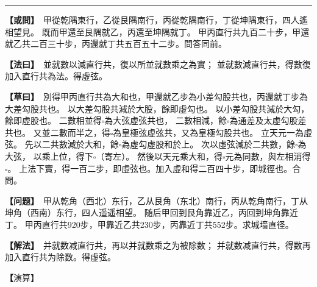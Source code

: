 \documentclass[11pt,a4paper]{article}
\let\origsquare\square
\renewcommand{\square}{\ensuremath{\origsquare}}%
\newcommand{\longline}{\noindent\rule{\textwidth}{0.4pt}}
\newcommand{\clOWEN}[1]{%
  \par\vspace{0.3em}%
  \noindent\textcolor{problemcolor}{\textbf{【或問】}}\,{\tradfont #1}\par\nopagebreak%
}
\newcommand{\mdOWEN}[1]{%
  \par\vspace{0.3em}%
  \noindent\textcolor{problemcolor}{\textbf{【问题】}}\,{\modfont #1}\par\nopagebreak%
}
\newcommand{\clFAYUE}[1]{%
  \par\noindent\textcolor{methodcolor}{\textbf{【法曰】}}\,{\tradfont #1}\par\nopagebreak%
}
\newcommand{\mdFAYUE}[1]{%
  \par\noindent\textcolor{methodcolor}{\textbf{【解法】}}\,{\modfont #1}\par\nopagebreak%
}
\newcommand{\clTSAOYUE}[1]{%
  \par\noindent\textcolor{workcolor}{\textbf{【草曰】}}\,{\tradfont #1}\par%
}
\newcommand{\mdTSAOYUE}[1]{%
  \par\noindent\textcolor{workcolor}{\textbf【演算】}}\,{\modfont #1}\par%
\begin{document}
\vspace{0.3cm}
\begin{center}\longline\end{center}

\begin{paracol}{2}

\begin{leftcolumn}
\clOWEN{%
甲從乾隅東行，乙從艮隅南行，丙從乾隅南行，丁從坤隅東行，四人遙相望見。
既而甲還至艮隅就乙，丙還至坤隅就丁。
甲丙直行共九百二十步，甲還就乙共二百三十步，丙還就丁共五百五十二步。問答同前。}

\clFAYUE{%
並就數以減直行共，復以所並就數乘之為實；
並就數減直行共，得數復加入直行共為法。得虛弦。}

\clTSAOYUE{%
別得甲丙直行共為大和也，甲還就乙步為小差勾股共也，丙還就丁步為大差勾股共也。
以大差勾股共減於大股，餘即虛勾也。
以小差勾股共減於大勾，餘即虛股也。
二數相並得$\square$為大弦虛弦共也，
二數相減，餘$\square$為通差及太虛勾股差共也。
又並二數而半之，得$\square$為皇極弦虛弦共，又為皇極勾股共也。
立天元一為虛弦。
先以二共數減於大和，餘$\square$為虛勾虛股和於上。
次以虛弦減於二共數，餘$\square$為大弦，
以乘上位，得下$\square$（寄左）。
然後以天元乘大和，得$\square$元為同數，與左相消得$\square$。
上法下實，得一百二步，即虛弦也。加入虛和得二百四十步，即城徑也。合問。}
\end{leftcolumn}

\switchcolumn

\begin{rightcolumn}
\mdOWEN{%
甲从乾角（西北）东行，乙从艮角（东北）南行，丙从乾角南行，丁从坤角（西南）东行，四人遥遥相望。
随后甲回到艮角靠近乙，丙回到坤角靠近丁。
甲丙直行共920步，甲靠近乙共230步，丙靠近丁共552步。求城墙直径。}

\mdFAYUE{%
并就数减直行共，再以并就数乘之为被除数；
并就数减直行共，得数再加入直行共为除数。得虚弦。}

\mdTSAOYUE{%
辨识得：甲丙直行共为大和，甲靠近乙步为小差勾股之和，丙靠近丁步为大差勾股之和。
以大差勾股之和减于大股余即虚勾。
以小差勾股之和减于大勾余即虚股。
两数相并得$\square$为大弦虚弦之和，
两数相减余$\square$为通差及太虚勾股差之和。
又两数相并折半得$\square$为皇极弦虚弦之和，又为皇极勾股之和。
设天元一为虚弦。
先以二共数减于大和余$\square$为虚勾虚股之和于上位。
次以虚弦减于二共数余$\square$为大弦，
乘上位得下式$\square$（寄左）。
然后天元乘大和得$\square$元为同数，与左式相消得$\square$。
上法下实，得102步即虚弦。加入虚和得240步即城径。符合所问。}
\end{rightcolumn}

\end{paracol}
\end{document}
